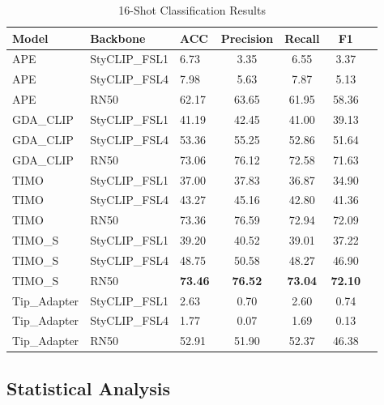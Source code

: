 \documentclass[conference,6pt]{IEEEtran}
\begin{document}
\begin{table}[H]
\centering
\tiny
\caption{16-Shot Classification Results}
\label{tab:results_16shot}
\begin{tabular}{@{}lll*{4}{S[table-format=2.2]}@{}}
\toprule
\textbf{Model} & \textbf{Backbone} & \textbf{ACC} & \textbf{Precision} & \textbf{Recall} & \textbf{F1} \\
\midrule
APE & StyCLIP\_FSL1 & 6.73 & 3.35 & 6.55 & 3.37 \\
APE & StyCLIP\_FSL4 & 7.98 & 5.63 & 7.87 & 5.13 \\
APE & RN50 & 62.17 & 63.65 & 61.95 & 58.36 \\
GDA\_CLIP & StyCLIP\_FSL1 & 41.19 & 42.45 & 41.00 & 39.13 \\
GDA\_CLIP & StyCLIP\_FSL4 & 53.36 & 55.25 & 52.86 & 51.64 \\
GDA\_CLIP & RN50 & 73.06 & 76.12 & 72.58 & 71.63 \\
TIMO & StyCLIP\_FSL1 & 37.00 & 37.83 & 36.87 & 34.90 \\
TIMO & StyCLIP\_FSL4 & 43.27 & 45.16 & 42.80 & 41.36 \\
TIMO & RN50 & 73.36 & 76.59 & 72.94 & 72.09 \\
TIMO\_S & StyCLIP\_FSL1 & 39.20 & 40.52 & 39.01 & 37.22 \\
TIMO\_S & StyCLIP\_FSL4 & 48.75 & 50.58 & 48.27 & 46.90 \\
TIMO\_S & RN50 & \textbf{73.46} & \textbf{76.52} & \textbf{73.04} & \textbf{72.10} \\
Tip\_Adapter & StyCLIP\_FSL1 & 2.63 & 0.70 & 2.60 & 0.74 \\
Tip\_Adapter & StyCLIP\_FSL4 & 1.77 & 0.07 & 1.69 & 0.13 \\
Tip\_Adapter & RN50 & 52.91 & 51.90 & 52.37 & 46.38 \\
\bottomrule
\end{tabular}
\end{table}
\clearpage
\subsection{Statistical Analysis}
\end{document}
